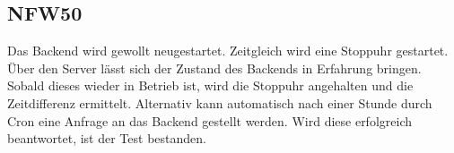 \subsection*{NFW50}

Das \Gls{Backend} wird gewollt neugestartet. Zeitgleich wird eine Stoppuhr gestartet.
Über den \Gls{Server} lässt sich der Zustand des \Gls{Backend}s in Erfahrung bringen.
Sobald dieses wieder in Betrieb ist, wird die Stoppuhr angehalten und die Zeitdifferenz ermittelt.
Alternativ kann automatisch nach einer Stunde durch \Gls{Cron} eine Anfrage an das \Gls{Backend} gestellt werden.
Wird diese erfolgreich beantwortet, ist der Test bestanden.